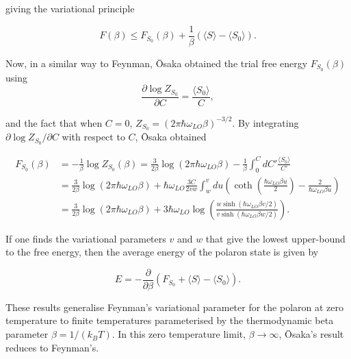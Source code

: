 giving the variational principle

\begin{equation}\label{eqn:osaka_var}
    F(\beta) \leq F_{S_0}(\beta) + \frac{1}{\beta} \left( \langle S\rangle - \langle S_0 \rangle \right).
\end{equation}

Now, in a similar way to Feynman, \=Osaka obtained the trial free energy $F_{S_0}(\beta)$ using
\begin{equation}
     \frac{\partial \log Z_{S_0}}{\partial C} = \frac{\langle S_0 \rangle}{C},
\end{equation}

and the fact that when $C = 0$, $Z_{S_0} = (2\pi\hbar\omega_{LO}\beta)^{-3/2}$. By integrating $\partial \log Z_{S_0} / \partial C$ with respect to $C$, \=Osaka obtained

\begin{equation}\label{eqn:osaka_trial_fenergy}
\begin{aligned}
    F_{S_0}(\beta) &= -\frac{1}{\beta} \log Z_{S_0}(\beta) = \frac{3}{2\beta} \log(2\pi\hbar\omega_{LO}\beta) - \frac{1}{\beta}\int^C_0 dC' \frac{\langle S_0 \rangle}{C'} \\
    &= \frac{3}{2\beta} \log(2\pi\hbar\omega_{LO}\beta) + \hbar\omega_{LO} \frac{3C}{2vw} \int_w^v du \left( \coth \left( \frac{\hbar\omega_{LO} \beta u}{2}\right) - \frac{2}{\hbar\omega_{LO}\beta u} \right) \\
    &= \frac{3}{2\beta} \log(2\pi\hbar\omega_{LO}\beta) + 3 \hbar \omega_{LO} \log \left( \frac{w \sinh \left( \hbar\omega_{LO} \beta v / 2 \right)}{v \sinh \left( \hbar\omega_{LO} \beta w / 2 \right)} \right).
\end{aligned}
\end{equation}

If one finds the variational parameters $v$ and $w$ that give the lowest upper-bound to the free energy, then the average energy of the polaron state is given by

\begin{equation}
    E = -\frac{\partial}{\partial \beta} \left( F_{S_0} + \langle S\rangle - \langle S_0 \rangle \right).
\end{equation}

These results generalise Feynman's variational parameter for the polaron at zero temperature to finite temperatures parameterised by the thermodynamic beta parameter $\beta = 1 / (k_B T)$. In this zero temperature limit, $\beta \to \infty$, \=Osaka's result reduces to Feynman's.

